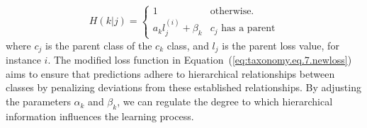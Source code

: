\begin{equation}
    \label{eq:taxonomy.eq.8.hierarchical_penalty.loss}
    H(k \vert j) = \left\{ \begin{array}{lc}1 & \text{otherwise.} \\ a_k l_j^{(i)} + \beta_k & c_j \text{ has a parent} \end{array} \right.
\end{equation}
where $c_j $ is the parent class of the $c_k $ class, and $l_j $ is the parent loss value, for instance $i $.
The modified loss function in Equation~(\ref{eq:taxonomy.eq.7.newloss}) aims to ensure that predictions adhere to hierarchical relationships between classes by penalizing deviations from these established relationships. By adjusting the parameters $\alpha_k $ and $\beta_k $, we can regulate the degree to which hierarchical information influences the learning process.
